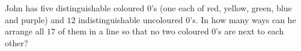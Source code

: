 John has five distinguishable coloured $0$'s (one each of red, yellow, green, blue and purple) and $12$ indistinguishable uncoloured $0$'s. In how many ways can he arrange all $17$ of them in a line so that no two coloured $0$'s are next to each other?
